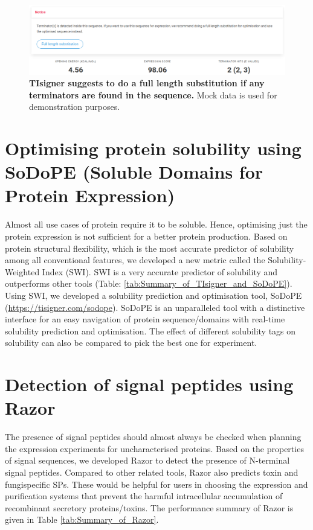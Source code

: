 \begin{figure}[htbp!]
\center
\includegraphics[width=1\textwidth]{chapters/Discussion/Figures/terminator_prompt.png}
\caption[TIsigner suggests to do a full length substitution if any terminators are found in the sequence.]{\textbf{TIsigner suggests to do a full length substitution if any terminators are found in the sequence.} Mock data is used for demonstration purposes.}%
\label{fig:terminator_prompt}
\end{figure}


\section{Optimising protein solubility using SoDoPE (Soluble Domains for Protein Expression)}
Almost all use cases of protein require it to be soluble. Hence, optimising just the protein expression is not sufficient for a better protein production. Based on protein structural flexibility, which is the most accurate predictor of solubility among all conventional features, we developed a new metric called the Solubility-Weighted Index (SWI). SWI is a very accurate predictor of solubility and outperforms other tools (Table: \ref{tab:Summary_of_TIsigner_and_SoDoPE}). Using SWI, we developed a solubility prediction and optimisation tool, SoDoPE (\href{https://tisigner.com/sodope}{https://tisigner.com/sodope}). SoDoPE is an unparalleled tool with a distinctive interface for an easy navigation of protein sequence/domains with real-time solubility prediction and optimisation. The effect of different solubility tags on solubility can also be compared to pick the best one for experiment.


\section{Detection of signal peptides using Razor}
The presence of signal peptides should almost always be checked when planning the expression experiments for uncharacterised proteins. Based on the properties of signal sequences, we developed Razor to detect the presence of N-terminal signal peptides. Compared to other related tools, Razor also predicts toxin and fungi\textemdash specific SPs. These would be helpful for users in choosing the expression and purification systems that prevent the harmful intracellular accumulation of recombinant secretory proteins/toxins. The performance summary of Razor is given in Table \ref{tab:Summary_of_Razor}.



